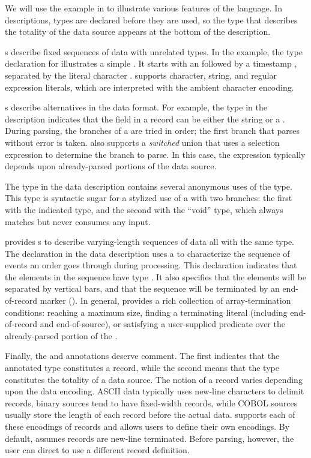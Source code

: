 We will use the example in  to illustrate
various features of the \pads{} language.  In \pads{} descriptions,
types are declared before they are used, so the type that describes
the totality of the data source appears at the bottom of the description.

s describe fixed sequences of data with unrelated types.
In the \dibbler{} example, the type declaration for 
illustrates a simple .  It starts with an
 followed by a timestamp , separated by
the literal character .
\pads{} supports character, string, and regular expression literals,
which are interpreted with the ambient character  encoding.

s describe alternatives in the data format.  For example, the
 type in the \dibbler{} description indicates that the  field 
in a \dibbler{} record can be either the string  or a .  During parsing, 
the branches of a  are tried in order; the first branch that 
parses without error is taken.  \pads{} also supports a
\textit{switched} union that uses a selection expression to determine
the branch to parse.  In this case, the expression typically depends upon
already-parsed portions of the data source. 

The  type in the \dibbler{} data description
contains several anonymous uses of the  type.  This type is
syntactic sugar for a stylized use of a  with two branches:
the first with the indicated type, and the second with the ``void''
type, which always matches but never consumes any input.

\pads{} provides s to describe varying-length sequences of data all 
with the same type.  The  declaration in the \dibbler{} data description
uses a  to characterize the sequence of events an
order goes through during processing.  This declaration indicates that the elements
in the sequence have type .  It also specifies that the elements will
be separated by vertical bars, and that the sequence will be terminated by 
an end-of-record marker ().  In general, \pads{} provides a rich collection
of array-termination conditions: reaching a maximum size, finding a terminating
literal (including end-of-record and end-of-source),
or satisfying a user-supplied predicate over the already-parsed portion of 
the .  

Finally, the  and  annotations deserve comment.  The first
indicates that the annotated type constitutes a record,
while the second means that the type constitutes the totality of a data source.  
The notion of a record varies depending upon the data encoding.  
ASCII data typically uses new-line characters to delimit 
records, binary sources tend to have fixed-width records, while 
COBOL sources usually store the length of each record before the actual data.
\pads{} supports each of these encodings of records and allows users to define
their own encodings.  By default, \pads{} assumes records are new-line terminated.
Before parsing, however, the user can direct \pads{} to use a different record
definition.


